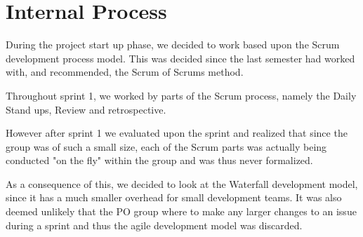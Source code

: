 \section{Internal Process}
During the project start up phase, we decided to work based upon the Scrum development process model.
This was decided since the last semester had worked with, and recommended, the Scrum of Scrums method. 

Throughout sprint 1, we worked by parts of the Scrum process, namely the Daily Stand ups, Review and retrospective. 

However after sprint 1 we evaluated upon the sprint and realized that since the group was of such a small size, each of the Scrum parts was actually being conducted "on the fly" within the group and was thus never formalized. 

As a consequence of this, we decided to look at the Waterfall development model, since it has a much smaller overhead for small development teams. 
It was also deemed unlikely that the PO group where to make any larger changes to an issue during a sprint and thus the agile development model was discarded.






